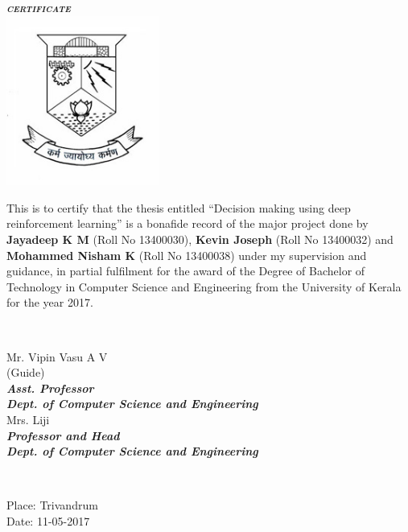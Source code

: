 \documentclass[a4paper,11pt]{article}
\begin{document}
	\begin{titlepage}
		\begin{centering}
			\textbf{\textit{\LARGE\textsc{{certificate}}}}\\[0.5cm]
			\includegraphics[width=5cm]{images/logo.jpg}\\

		\end{centering}

		\large{This is to certify that the thesis entitled ``Decision making using deep reinforcement learning'' is a bonafide record of the major project done by \textbf{Jayadeep K M} (Roll No 13400030), \textbf{Kevin Joseph} (Roll No 13400032) and \textbf{Mohammed Nisham K} (Roll No 13400038) under my supervision and guidance, in partial fulfilment for the award of the Degree of Bachelor of Technology in Computer Science and Engineering from the University of Kerala for the year 2017.}\\[1.5cm]

		\begin{minipage}{0.4\textwidth}
		\begin{flushleft}
		\end{flushleft}
		\end{minipage}
		~
		\begin{minipage}{0.6\textwidth}
		\begin{centering} \large
		\large{Mr. Vipin Vasu A V}\\
		\small{(Guide)}\\
		\small{\textit{\textbf{Asst. Professor}}}\\
		\small{\textit{\textbf{Dept. of Computer Science and Engineering}}}\\[1.5cm]

		\large{Mrs. Liji}\\
		\small{\textit{\textbf{Professor and Head}}}\\
		\small{\textit{\textbf{Dept. of Computer Science and Engineering}}}\\
		\end{centering}
		\end{minipage}\\[1.0cm]

		\begin{flushleft}
		Place: Trivandrum\\
		Date:  11-05-2017\\
		\end{flushleft}
		\vfill %
	\end{titlepage}
\end{document}
